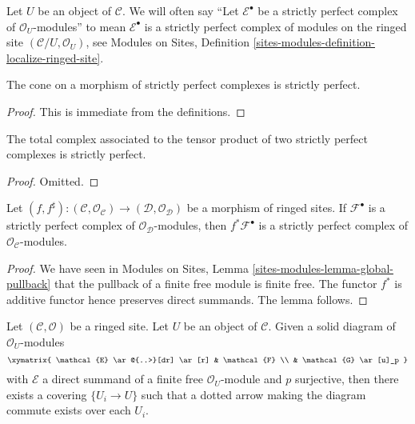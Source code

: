\noindent
Let $U$ be an object of $\mathcal{C}$. We will often say
``Let $\mathcal{E}^\bullet$ be a strictly perfect complex of
$\mathcal{O}_U$-modules'' to mean $\mathcal{E}^\bullet$ is a strictly perfect
complex of modules on the ringed site $(\mathcal{C}/U, \mathcal{O}_U)$, see
Modules on Sites, Definition
\ref{sites-modules-definition-localize-ringed-site}.

\begin{lemma}
\label{lemma-cone}
The cone on a morphism of strictly perfect complexes is
strictly perfect.
\end{lemma}

\begin{proof}
This is immediate from the definitions.
\end{proof}

\begin{lemma}
\label{lemma-tensor}
The total complex associated to the tensor product of two
strictly perfect complexes is strictly perfect.
\end{lemma}

\begin{proof}
Omitted.
\end{proof}

\begin{lemma}
\label{lemma-strictly-perfect-pullback}
Let $(f, f^\sharp) : (\mathcal{C}, \mathcal{O}_\mathcal{C}) \to
(\mathcal{D}, \mathcal{O}_\mathcal{D})$
be a morphism of ringed sites. If $\mathcal{F}^\bullet$ is a strictly
perfect complex of $\mathcal{O}_\mathcal{D}$-modules, then
$f^*\mathcal{F}^\bullet$ is a strictly perfect complex of
$\mathcal{O}_\mathcal{C}$-modules.
\end{lemma}

\begin{proof}
We have seen in
Modules on Sites, Lemma \ref{sites-modules-lemma-global-pullback}
that the pullback of a finite free module is finite free. The functor
$f^*$ is additive functor hence preserves direct summands. The lemma follows.
\end{proof}

\begin{lemma}
\label{lemma-local-lift-map}
Let $(\mathcal{C}, \mathcal{O})$ be a ringed site. Let $U$ be an object of
$\mathcal{C}$. Given a solid diagram of $\mathcal{O}_U$-modules
$$
\xymatrix{
\mathcal{E} \ar@{..>}[dr] \ar[r] & \mathcal{F} \\
& \mathcal{G} \ar[u]_p
}
$$
with $\mathcal{E}$ a direct summand of a finite free
$\mathcal{O}_U$-module and $p$ surjective, then there exists a
covering $\{U_i \to U\}$ such that a dotted arrow
making the diagram commute exists over each $U_i$.
\end{lemma}

